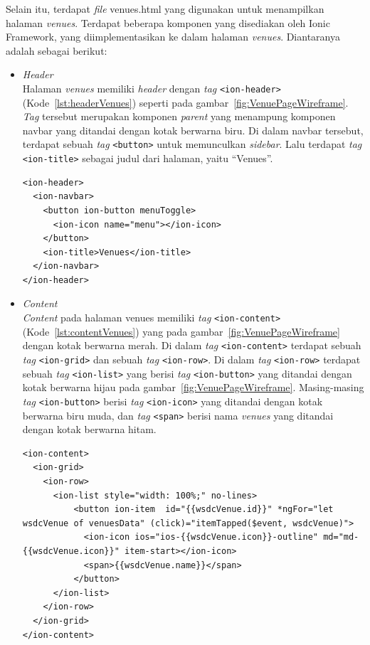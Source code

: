 \begin{enumerate}
	Selain itu, terdapat \textit{file} venues.html yang digunakan untuk menampilkan halaman \textit{venues}. Terdapat beberapa komponen yang disediakan oleh Ionic Framework, yang diimplementasikan ke dalam halaman \textit{venues}. Diantaranya adalah sebagai berikut:	
	
	\begin{itemize}
		\item \textit{Header} \\
		Halaman \textit{venues} memiliki \textit{header} dengan \textit{tag} \texttt{<ion-header>} (Kode~\ref{lst:headerVenues}) seperti pada gambar~\ref{fig:VenuePageWireframe}. \textit{Tag} tersebut merupakan komponen \textit{parent} yang menampung komponen navbar yang ditandai dengan kotak berwarna biru. Di dalam navbar tersebut, terdapat sebuah \textit{tag} \texttt{<button>} untuk memunculkan \textit{sidebar}. Lalu terdapat \textit{tag} \texttt{<ion-title>} sebagai judul dari halaman, yaitu ``Venues''.
		
\begin{lstlisting}[label={lst:headerVenues}, caption=\textit{Header} pada venues.html]
<ion-header>
  <ion-navbar>
    <button ion-button menuToggle>
      <ion-icon name="menu"></ion-icon>
    </button>
    <ion-title>Venues</ion-title>
  </ion-navbar>
</ion-header>
\end{lstlisting}

		\item \textit{Content} \\
		\textit{Content} pada halaman venues memiliki \textit{tag} \texttt{<ion-content>} (Kode~\ref{lst:contentVenues}) yang pada gambar~\ref{fig:VenuePageWireframe} dengan kotak berwarna merah. Di dalam \textit{tag} \texttt{<ion-content>} terdapat sebuah \textit{tag} \texttt{<ion-grid>} dan sebuah \textit{tag} \texttt{<ion-row>}. Di dalam \textit{tag} \texttt{<ion-row>} terdapat sebuah \textit{tag} \texttt{<ion-list>} yang berisi \textit{tag} \texttt{<ion-button>} yang ditandai dengan kotak berwarna hijau pada gambar~\ref{fig:VenuePageWireframe}. Masing-masing \textit{tag} \texttt{<ion-button>} berisi \textit{tag} \texttt{<ion-icon>} yang ditandai dengan kotak berwarna biru muda, dan \textit{tag} \texttt{<span>} berisi nama \textit{venues} yang ditandai dengan kotak berwarna hitam. 
		
\begin{lstlisting}[label={lst:contentVenues}, caption=\textit{Content} pada venues.html]
<ion-content>
  <ion-grid>
    <ion-row>
      <ion-list style="width: 100%;" no-lines>
          <button ion-item  id="{{wsdcVenue.id}}" *ngFor="let wsdcVenue of venuesData" (click)="itemTapped($event, wsdcVenue)">
            <ion-icon ios="ios-{{wsdcVenue.icon}}-outline" md="md-{{wsdcVenue.icon}}" item-start></ion-icon>
            <span>{{wsdcVenue.name}}</span>
          </button>
      </ion-list>
    </ion-row>
  </ion-grid>
</ion-content>
\end{lstlisting}
	\end{itemize}


\end{enumerate}
